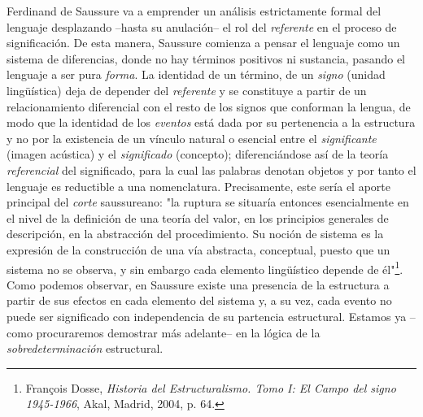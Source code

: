 \documentclass{book}
\begin{document}
Ferdinand de Saussure va a emprender un análisis estrictamente formal
del lenguaje desplazando --hasta su anulación-- el rol del
\emph{referente} en el proceso de significación. De esta manera,
Saussure comienza a pensar el lenguaje como un sistema de diferencias,
donde no hay términos positivos ni sustancia, pasando el lenguaje a ser
pura \emph{forma}. La identidad de un término, de un \emph{signo}
(unidad lingüística) deja de depender del \emph{referente} y se
constituye a partir de un relacionamiento diferencial con el resto de
los signos que conforman la lengua, de modo que la identidad de los
\emph{eventos} está dada por su pertenencia a la estructura y no por la
existencia de un vínculo natural o esencial entre el \emph{significante}
(imagen acústica) y el \emph{significado} (concepto); diferenciándose
así de la teoría \emph{referencial} del significado, para la cual las
palabras denotan objetos y por tanto el lenguaje es reductible a una
nomenclatura. Precisamente, este sería el aporte principal del
\emph{corte} saussureano: "la ruptura se situaría entonces esencialmente
en el nivel de la definición de una teoría del valor, en los principios
generales de descripción, en la abstracción del procedimiento. Su noción
de sistema es la expresión de la construcción de una vía abstracta,
conceptual, puesto que un sistema no se observa, y sin embargo cada
elemento lingüístico depende de él"\footnote{François Dosse,
  \emph{Historia del Estructuralismo. Tomo I: El Campo del signo
  1945-1966}, Akal, Madrid, 2004, p. 64.}. Como podemos observar, en
Saussure existe una presencia de la estructura a partir de sus efectos
en cada elemento del sistema y, a su vez, cada evento no puede ser
significado con independencia de su partencia estructural. Estamos ya
--como procuraremos demostrar más adelante-- en la lógica de la
\emph{sobredeterminación} estructural.
\end{document}
